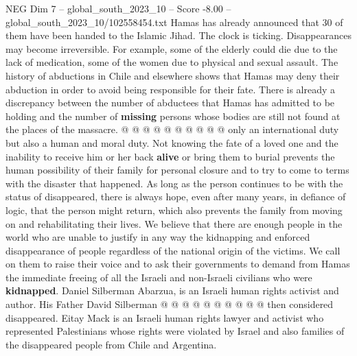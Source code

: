 \begin{textsample}{NEG Dim 7 – global\_south\_2023\_10 – Score -8.00 – global\_south\_2023\_10/102558454.txt}
Hamas has already announced that 30 of them have been handed to the Islamic Jihad.
The clock is ticking.
Disappearances may become irreversible.
For example, some of the elderly could die due to the lack of medication, some of the women due to physical and sexual assault.
The history of abductions in Chile and elsewhere shows that Hamas may deny their abduction in order to avoid being responsible for their fate.
There is already a discrepancy between the number of abductees that Hamas has admitted to be holding and the number of \textbf{missing} persons whose bodies are still not found at the places of the massacre. @ @ @ @ @ @ @ @ @ @ only an international duty but also a human and moral duty.
Not knowing the fate of a loved one and the inability to receive him or her back \textbf{alive} or bring them to burial prevents the human possibility of their family for personal closure and to try to come to terms with the disaster that happened.
As long as the person continues to be with the status of disappeared, there is always hope, even after many years, in defiance of logic, that the person might return, which also prevents the family from moving on and rehabilitating their lives.
We believe that there are enough people in the world who are unable to justify in any way the kidnapping and enforced disappearance of people regardless of the national origin of the victims.
We call on them to raise their voice and to ask their governments to demand from Hamas the immediate freeing of all the Israeli and non-Israeli civilians who were \textbf{kidnapped}.
Daniel Silberman Abarzua, is an Israeli human rights activist and author.
His Father David Silberman @ @ @ @ @ @ @ @ @ @ then considered disappeared.
Eitay Mack is an Israeli human rights lawyer and activist who represented Palestinians whose rights were violated by Israel and also families of the disappeared people from Chile and Argentina.

\end{textsample}
